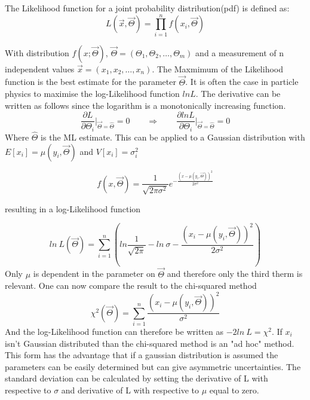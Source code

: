 \documentclass[../Bachelorarbeit.tex]{subfiles}
\begin{document}
The Likelihood function for a joint probability distribution(pdf) is defined as:
\begin{equation}
    L(\overrightarrow{x},\overrightarrow{\Theta}) = \prod_{i=1}^{n} f(x_{i},\overrightarrow{\Theta})
\end{equation}

With distribution $f(x;\overrightarrow{\Theta})$, $\overrightarrow{\Theta} = (\Theta_{1},\Theta_{2},\dots,\Theta_{m})$ and a measurement of n independent values $\overrightarrow{x}=(x_{1},x_{2},\dots,x_{n})$.
The Maxmimum of the Likelihood function is the best estimate for the parameter $\overrightarrow{\Theta}$.
It is often the case in particle physics to maximise the  log-Likelihood function $ln L$. The derivative can be written as follows since the logarithm is a monotonically increasing function.
\begin{equation}
    \frac{\partial L}{\partial \Theta_{i}} \bigg \vert_{\overrightarrow{\Theta}=\hat{\Theta}} = 0 \qquad \Longrightarrow \qquad \frac{\partial ln L}{\partial \Theta_{i}} \bigg \vert_{\overrightarrow{\Theta}=\hat{\Theta}}=0
\end{equation}
Where $\hat{\Theta}$ is the ML estimate. This can be applied to a Gaussian distribution with $E[x_{i}]=\mu(y_{i},\overrightarrow{\Theta})$ and $V[x_{i}]=\sigma_{i}^{2}$

\begin{equation}
    f(x,\overrightarrow{\Theta}) = \frac{1}{\sqrt{2\pi \sigma^{2}}} e^{-\frac{(x-\mu(y_{i},\overrightarrow{\Theta}))^{2}}{2 \sigma^{2}}}
\end{equation}

resulting in a log-Likelihood function

\begin{equation}
    ln \: L(\overrightarrow{\Theta}) = \sum^{n}_{i=1} \left( ln \frac{1}{\sqrt{2\pi}}-ln \: \sigma - \frac{(x_{i} - \mu(y_{i},\overrightarrow{\Theta}))^2}{2 \sigma^{2}}\right)
\end{equation}
Only $\mu$ is dependent in the parameter on $\overrightarrow{\Theta}$ and therefore only the third therm is relevant. One can now compare the result to the chi-squared method
\begin{equation}
    \chi^{2}(\overrightarrow{\Theta}) = \sum^{n}_{i=1} \frac{(x_{i} - \mu(y_{i},\overrightarrow{\Theta}))^2}{\sigma^{2}}
\end{equation}
And the log-Likelihood function can therefore be written as $-2 ln \: L = \chi^{2}$. If $x_{i}$ isn't Gaussian distributed than the chi-squared method is an "ad hoc" method.
This form has the advantage that if a gaussian distribution is assumed the parameters can be easily determined but can give asymmetric uncertainties.
The standard deviation can be calculated by setting the derivative of L with respective to $\sigma$ and derivative of L with respective to $\mu$ equal to zero.
\end{document}
